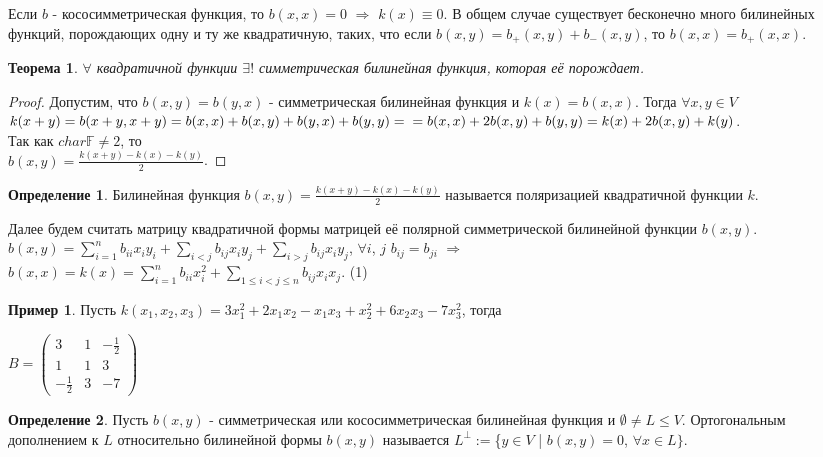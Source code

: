 \documentclass[a4paper, 12pt]{article}
\newcommand{\F}{\mathbb F}
\theoremstyle{definition}
\newtheorem*{definition}{Определение}
\newtheorem*{example1}{Пример}
\theoremstyle{plain}
\newtheorem*{theorem}{Теорема}
\theoremstyle{remark}
\begin{document}
  Если $b$ - кососимметрическая функция, то $b(x,x)=0$ $\Longrightarrow$ $k(x)\equiv0$. В общем случае существует бесконечно много билинейных функций, порождающих одну и ту же квадратичную, таких, что если $b(x,y)=b_+(x,y)+b_-(x,y)$, то $b(x,x)=b_+(x,x)$.
  \begin{theorem}
    $\forall$ квадратичной функции $\exists!$ симметрическая билинейная функция, которая её порождает.
  \end{theorem}
  \begin{proof}
    Допустим, что $b(x,y) = b(y,x)$ - симметрическая билинейная функция и $k(x) = b(x,x)$. Тогда $\forall x, y\in V$\\ 
    $k(x+y) = b(x+y, x+y) = b(x,x)+b(x,y)+b(y,x)+b(y,y)=\\ = b(x,x)+2b(x,y)+b(y,y) = k(x)+2b(x,y)+k(y)$.
    \\ Так как $char\F\neq2$, то\\ $b(x,y)=\frac{k(x+y)-k(x)-k(y)}{2}$.
  \end{proof}
  \begin{definition}
    Билинейная функция $b(x,y) = \frac{k(x+y)-k(x)-k(y)}{2}$ называется поляризацией квадратичной функции $k$.
  \end{definition}
  Далее будем считать матрицу квадратичной формы матрицей её полярной симметрической билинейной функции $b(x,y)$.\\
  $b(x,y)=\sum\limits_{i=1}^nb_{ii}x_iy_i+\sum\limits_{i<j}b_{ij}x_iy_j+\sum\limits_{i>j}b_{ij}x_iy_j$, $\forall i$, $j$ $b_{ij}=b_{ji}$ $\Longrightarrow$\\
  $b(x,x)=k(x)=\sum\limits_{i=1}^nb_{ii}x_i^2+\sum\limits_{1\leqslant i<j\leqslant n}b_{ij}x_ix_j$.  (1)
  \begin{example1}
    Пусть $k(x_1,x_2, x_3)=3x_1^2+2x_1x_2-x_1x_3+x_2^2+6x_2x_3-7x_3^2$, тогда\\
    \begin{center}  
      $B=\begin{pmatrix}
        3 & 1 & -\frac{1}{2}\\
        1 & 1 &  3\\
        -\frac{1}{2} &  3 & -7
      \end{pmatrix}$
    \end{center}
  \end{example1}
  \begin{definition}
    Пусть $b(x,y)$ - симметрическая или кососимметрическая билинейная функция и $\emptyset\neq L\leqslant V$. Ортогональным дополнением к $L$ относительно билинейной формы $b(x,y)$ называется $L^{\perp}:=$\{$y\in V$ | $b(x,y)=0$, $\forall x\in L\}$.
  \end{definition}
\end{document}
